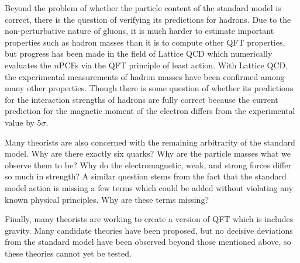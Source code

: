 Beyond the problem of whether the particle content of the standard model is correct, there is the question of verifying its predictions for hadrons. Due to the non-perturbative nature of gluons, it is much harder to estimate important properties such as hadron masses than it is to compute other QFT properties, but progress has been made in the field of Lattice QCD which numerically evaluates the $n$PCFs via the QFT principle of least action. With Lattice QCD, the experimental measurements of hadron masses have been confirmed among many other properties. Though there is some question of whether its predictions for the interaction strengths of hadrons are fully correct because the current prediction for the magnetic moment of the electron differs from the experimental value by $5\sigma$.

Many theorists are also concerned with the remaining arbitrarity of the standard model. Why are there exactly six quarks? Why are the particle masses what we observe them to be? Why do the electromagnetic, weak, and strong forces differ so much in strength? A similar question stems from the fact that the standard model action is missing a few terms which could be added without violating any known physical principles. Why are these terms missing?

Finally, many theorists are working to create a version of QFT which is includes gravity. Many candidate theories have been proposed, but no decisive deviations from the standard model have been observed beyond those mentioned above, so these theories cannot yet be tested.